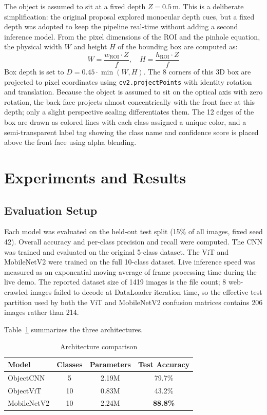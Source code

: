 \documentclass[conference]{IEEEtran}
\begin{document}
The object is assumed to sit at a fixed depth $Z = 0.5\,\text{m}$. This is a
deliberate simplification: the original proposal explored monocular depth cues,
but a fixed depth was adopted to keep the pipeline real-time without adding a
second inference model. From the pixel dimensions of the ROI and the pinhole
equation, the physical width $W$ and height $H$ of the bounding box are computed
as:
\begin{equation}
W = \frac{w_\text{ROI} \cdot Z}{f}, \quad H = \frac{h_\text{ROI} \cdot Z}{f}
\end{equation}
Box depth is set to $D = 0.45 \cdot \min(W, H)$. The 8 corners of this 3D box
are projected to pixel coordinates using \texttt{cv2.projectPoints} with
identity rotation and translation. Because the object is assumed to sit on the
optical axis with zero rotation, the back face projects almost concentrically
with the front face at this depth; only a slight perspective scaling
differentiates them. The 12 edges of the box are drawn as colored lines with
each class assigned a unique color, and a semi-transparent label tag showing the
class name and confidence score is placed above the front face using alpha
blending.

\section{Experiments and Results}

\subsection{Evaluation Setup}

Each model was evaluated on the held-out test split (15\% of all images,
fixed seed 42). Overall accuracy and per-class precision and recall were
computed. The CNN was trained and evaluated on the original 5-class dataset.
The ViT and MobileNetV2 were trained on the full 10-class dataset. Live
inference speed was measured as an exponential moving average of frame
processing time during the live demo. The reported dataset size of 1419 images
is the file count; 8 web-crawled images failed to decode at DataLoader
iteration time, so the effective test partition used by both the ViT and
MobileNetV2 confusion matrices contains 206 images rather than 214.

Table~\ref{tab:model_comparison} summarizes the three architectures.

\begin{table}[h]
\centering
\caption{Architecture comparison}
\label{tab:model_comparison}
\begin{tabular}{lccc}
\toprule
Model & Classes & Parameters & Test Accuracy \\
\midrule
ObjectCNN     & 5  & 2.19M & 79.7\% \\
ObjectViT     & 10 & 0.83M & 43.2\% \\
MobileNetV2   & 10 & 2.24M & \textbf{88.8\%} \\
\bottomrule
\end{tabular}
\end{table}
\end{document}
